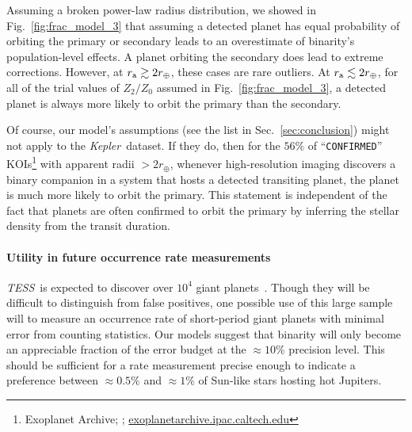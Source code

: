 \documentclass[12pt,modern]{aastex61}
\renewcommand{\a}{_{\rm a}}
\begin{document}
Assuming a broken power-law radius distribution, we showed in 
Fig.~\ref{fig:frac_model_3} that assuming a detected planet has equal 
probability of orbiting the primary or secondary leads to an overestimate of
binarity's population-level effects.
A planet orbiting the secondary does lead to extreme corrections.
However, at $r\a \gtrsim 2r_\oplus$, these cases are rare outliers.
At $r\a \lesssim 2r_\oplus$, for all of the trial values of $Z_2/Z_0$ assumed 
in Fig.~\ref{fig:frac_model_3}, a detected planet is always more likely to 
orbit the primary than the secondary.

Of course, our model's assumptions (see the list in Sec.~\ref{sec:conclusion}) 
might not apply to the {\it Kepler}\ dataset.
If they do, then for the $56\%$ of ``\texttt{CONFIRMED}'' 
KOIs\footnote{Exoplanet Archive; \cite{akeson_nasa_2013}; 
\url{exoplanetarchive.ipac.caltech.edu}} with 
apparent radii $>2r_\oplus$, 
whenever high-resolution imaging 
discovers a binary companion in 
a system that hosts a detected transiting planet, the planet is much
more likely to orbit the primary.
This statement is independent of the fact that planets are often confirmed to 
orbit the primary by inferring the stellar density from the transit duration.


\paragraph{Utility in future occurrence rate measurements}
{\it TESS}\ is expected to discover over $10^4$ giant 
planets~\citep{ricker_transiting_2014,sullivan_transiting_2015}.
Though they will be difficult to distinguish from false positives, one 
possible use of this large sample will to measure an occurrence rate of 
short-period giant planets with minimal error from counting statistics.
Our models suggest that binarity will only become an appreciable fraction of 
the error budget at the $\approx 10\%$ precision level.
This should be sufficient for a rate measurement precise enough to indicate a 
preference between $\approx 0.5\%$ and $\approx 1\%$ of Sun-like stars hosting 
hot Jupiters.

\end{document}
